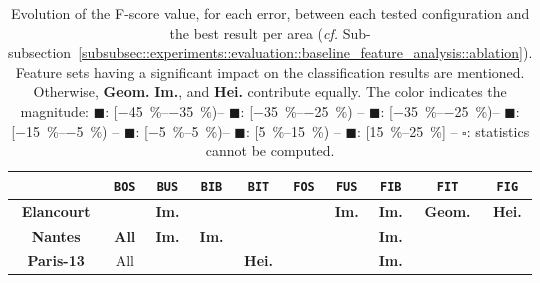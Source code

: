         \begin{table}[htbp]
            \footnotesize 
            \centering
            \renewcommand{\arraystretch}{1.5}
            \begin{tabular}{c | c c c c |c c c c c}
                \hline
                & \texttt{BOS} & \texttt{BUS}&\texttt{BIB}&\texttt{BIT}&\texttt{FOS} & \texttt{FUS}&\texttt{FIB}&\texttt{FIT}&\texttt{FIG}\\
                \hline
                \textbf{Elancourt} & \cellcolor{LOSS1525}& \cellcolor{LOSS1525}\textbf{Im.}& \cellcolor{LOSS1525}&\cellcolor{LOSS1525} &\cellcolor{STBL} &\cellcolor{GAIN0515}\textbf{Im.} &\cellcolor{GAIN1525}\textbf{Im.} &\cellcolor{LOSS0515}\textbf{Geom.} & \cellcolor{LOSS0515} \textbf{Hei.}\\
                \textbf{Nantes} & \cellcolor{STBL}\textbf{All}& \cellcolor{LOSS1525}\textbf{Im.}&\cellcolor{LOSS0515}\textbf{Im.} &\cellcolor{GAIN1525} &\cellcolor{STBL} & \cellcolor{STBL}& \cellcolor{LOSS1525}\textbf{Im.}& &\cellcolor{STBL}\\
                \textbf{Paris-13} &\cellcolor{LOSS1525}All &\cellcolor{LOSS1525} & &\cellcolor{GAIN0515}\textbf{Hei.} &\cellcolor{STBL} &\cellcolor{LOSS3545} &\cellcolor{LOSS1525}\textbf{Im.} & &\cellcolor{LOSS0515}\\
                \hline
            \end{tabular}
            \renewcommand{\arraystretch}{1}
            \caption{
                \label{tab::generalization_comparison} Evolution of the F-score value, for each error, between each tested configuration and the best result per area (\textit{cf.} Sub-subsection~\ref{subsubsec::experiments::evaluation::baseline_feature_analysis::ablation}).
                Feature sets having a significant impact on the classification results are mentioned.
                Otherwise, \textbf{Geom.} \textbf{Im.}, and \textbf{Hei.} contribute equally.
                The color indicates the magnitude: \textcolor{LOSS3545}{$\blacksquare$}: [\SIrange[range-phrase={,  }]{-45}{-35}{\percent})--
                \textcolor{LOSS2535}{$\blacksquare$}: [\SIrange[range-phrase={, }]{-35}{-25}{\percent}) --
                \textcolor{LOSS1525}{$\blacksquare$}: [\SIrange[range-phrase={, }]{-35}{-25}{\percent})--
                \textcolor{LOSS0515}{$\blacksquare$}: [\SIrange[range-phrase={, }]{-15}{-5}{\percent}) --
                \textcolor{STBL}{$\blacksquare$}: [\SIrange[range-phrase={, }]{-5}{5}{\percent})--
                \textcolor{GAIN0515}{$\blacksquare$}: [\SIrange[range-phrase={, }]{5}{15}{\percent}) --
                \textcolor{GAIN1525}{$\blacksquare$}: [\SIrange[range-phrase={, }]{15}{25}{\percent}] --
                $\square$: statistics cannot be computed.
            }
        \end{table}
            
